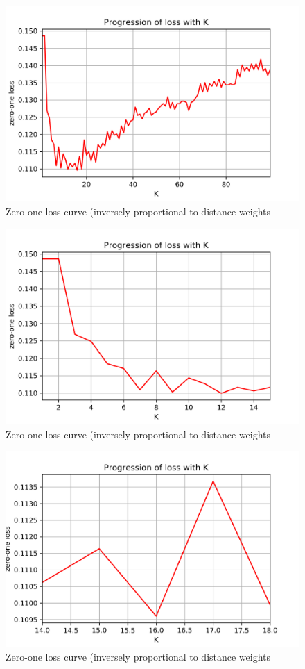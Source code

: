 \documentclass[a4paper]{article}
\begin{document}
\begin{figure}[H]
    \centering
    \includegraphics[width=12cm]{error_distance}
    \caption{Zero-one loss curve (inversely proportional to distance weights}
    \label{fig:ex2-b-error_distance_0}
\end{figure}

\begin{figure}[H]
    \centering
    \includegraphics[width=12cm]{error_distance_(mid_zoom)}
    \caption{Zero-one loss curve (inversely proportional to distance weights}
    \label{fig:ex2-b-error_distance_1}
\end{figure}

\begin{figure}[H]
    \centering
    \includegraphics[width=12cm]{error_distance_(full_zoom)}
    \caption{Zero-one loss curve (inversely proportional to distance weights}
    \label{fig:ex2-b-error_distance_2}
\end{figure}

\end{document}
